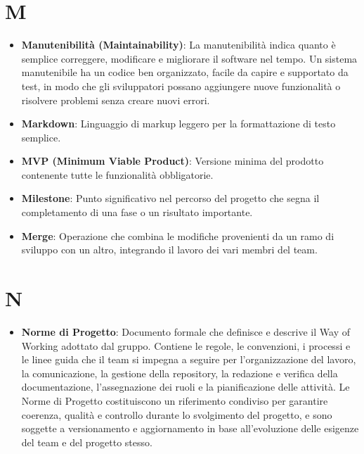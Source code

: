 \documentclass[11pt,a4paper]{article}
\begin{document}
\section*{M}
\begin{itemize}
\item \textbf{Manutenibilità (Maintainability)}: La manutenibilità indica quanto è semplice correggere, modificare e migliorare il software nel tempo. Un sistema manutenibile ha un codice ben organizzato, facile da capire e supportato da test, in modo che gli sviluppatori possano aggiungere nuove funzionalità o risolvere problemi senza creare nuovi errori.

\item \textbf{Markdown}: Linguaggio di markup leggero per la formattazione di testo semplice.

\item \textbf{MVP (Minimum Viable Product)}: Versione minima del prodotto contenente tutte le funzionalità obbligatorie.

\item \textbf{Milestone}: Punto significativo nel percorso del progetto che segna il completamento di una fase o un risultato importante.

\item \textbf{Merge}: Operazione che combina le modifiche provenienti da un ramo di sviluppo con un altro, integrando il lavoro dei vari membri del team.

\end{itemize}
\newpage

\section*{N}
\begin{itemize}
\item \textbf{Norme di Progetto}: Documento formale che definisce e descrive il Way of Working adottato dal gruppo. Contiene le regole, le convenzioni, i processi e le linee guida che il team si impegna a seguire per l’organizzazione del lavoro, la comunicazione, la gestione della repository, la redazione e verifica della documentazione, l’assegnazione dei ruoli e la pianificazione delle attività. Le Norme di Progetto costituiscono un riferimento condiviso per garantire coerenza, qualità e controllo durante lo svolgimento del progetto, e sono soggette a versionamento e aggiornamento in base all’evoluzione delle esigenze del team e del progetto stesso.

\end{itemize}
\end{document}
